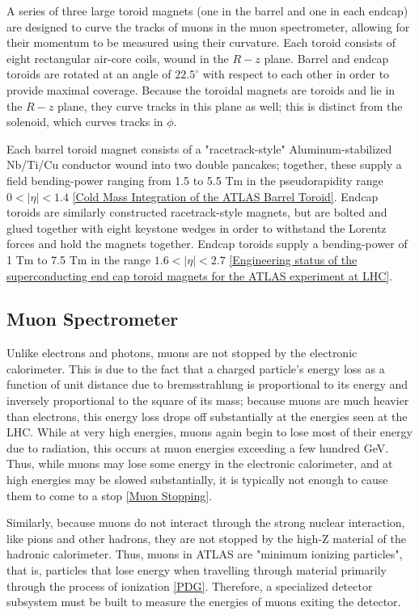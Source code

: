 A series of three large toroid magnets (one in the barrel and one in each endcap) are designed to curve the tracks of muons in the muon spectrometer, allowing for their momentum to be measured using their curvature. Each toroid consists of eight rectangular air-core coils, wound in the $R - z$ plane. Barrel and endcap toroids are rotated at an angle of $22.5 ^{\circ}$ with respect to each other in order to provide maximal coverage. Because the toroidal magnets are toroids and lie in the $R - z$ plane, they curve tracks in this plane as well; this is distinct from the solenoid, which curves tracks in $\phi$.

Each barrel toroid magnet consists of a "racetrack-style" Aluminum-stabilized Nb/Ti/Cu conductor wound into two double pancakes; together, these supply a field bending-power ranging from 1.5 to 5.5 Tm  in the pseudorapidity range  $0 < |\eta | < 1.4$ \ref{Cold Mass Integration of the ATLAS Barrel Toroid}. Endcap toroids are similarly constructed racetrack-style magnets, but are bolted and glued together with eight keystone wedges in order to withstand the Lorentz forces and hold the magnets together. Endcap toroids supply a bending-power of 1 Tm to 7.5 Tm in the range $ 1.6 < |\eta | < 2.7 $ \ref{Engineering status of the superconducting end cap toroid magnets for the ATLAS experiment at LHC}.

\subsection{Muon Spectrometer} \label{sec:Musyst}
 
Unlike electrons and photons, muons are not stopped by the electronic calorimeter. This is due to the fact that a charged particle's energy loss as a function of unit distance due to bremsstrahlung is proportional to its energy and inversely proportional to the square of its mass; because muons are much heavier than electrons, this energy loss drops off substantially at the energies seen at the LHC. While at very high energies, muons again begin to lose most of their energy due to radiation, this occurs at muon energies exceeding a few hundred GeV. Thus, while muons may lose some energy in the electronic calorimeter, and at high energies may be slowed substantially, it is typically not enough to cause them to come to a stop \ref{Muon Stopping}. 

Similarly, because muons do not interact through the strong nuclear interaction, like pions and other hadrons, they are not stopped by the high-Z material of the hadronic calorimeter. Thus, muons in ATLAS are "minimum ionizing particles", that is, particles that lose energy when travelling through material primarily through the process of ionization \ref{PDG}. Therefore, a specialized detector subsystem must be built to measure the energies of muons exiting the detector.

